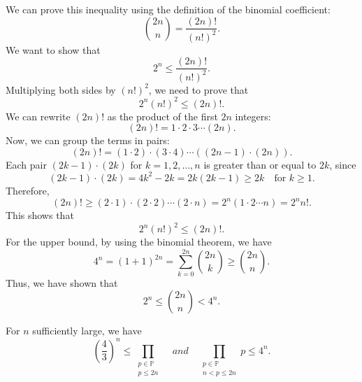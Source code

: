 \documentclass{elegantbook}
\begin{document}
\begin{solution}
  We can prove this inequality using the definition of the binomial coefficient:
  \[
    \binom{2n}{n} = \frac{(2n)!}{(n!)^2}.
  \]
  We want to show that
  \[
    2^n \leq \frac{(2n)!}{(n!)^2}.
  \]
  Multiplying both sides by $(n!)^2$, we need to prove that
  \[
    2^n (n!)^2 \leq (2n)!.
  \]
  We can rewrite $(2n)!$ as the product of the first $2n$ integers:
  \[
    (2n)! = 1 \cdot 2 \cdot 3 \cdots (2n).
  \]
  Now, we can group the terms in pairs:
  \[
    (2n)! = (1 \cdot 2) \cdot (3 \cdot 4) \cdots ((2n-1) \cdot (2n)).
  \]
  Each pair $(2k-1) \cdot (2k)$ for $k = 1, 2, \ldots, n$ is greater than or equal to $2k$, since
  \[
    (2k-1) \cdot (2k) = 4k^2 - 2k = 2k(2k-1) \geq 2k \quad \text{for } k \geq 1.
  \]
  Therefore, 
  \[
    (2n)! \geq (2 \cdot 1) \cdot (2 \cdot 2) \cdots (2 \cdot n) = 2^n (1 \cdot 2 \cdots n) = 2^n n!.
  \]
  This shows that
  \[
    2^n (n!)^2 \leq (2n)!.
  \]
  For the upper bound, by using the binomial theorem, we have
  \[
    4^n = (1 + 1)^{2n} = \sum_{k=0}^{2n} \binom{2n}{k} \geq \binom{2n}{n}.
  \]
  Thus, we have shown that
  \[
    2^n \leq \binom{2n}{n} < 4^n.
  \]
\end{solution}

\begin{lemma} \label{lem:Chebyshev_product_bounds_lemma}
  For $n$ sufficiently large, we have
  \[
    \left(\frac{4}{3}\right)^n\leq \prod_{\substack{p \in \mathbb{P} \\ p \leq 2n}} \quad {and} \quad \prod_{\substack{p \in \mathbb{P} \\ n<p \leq 2n}} p \leq 4^n.
  \]
\end{lemma}
\end{document}
